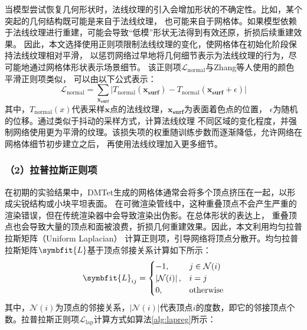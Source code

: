 当模型尝试恢复几何形状时，法线纹理的引入会增加形状的不确定性。比如，某个突起的几何结构既可能是来自于法线纹理，
也可能来自于网格体。如果模型依赖于法线纹理进行重建，可能会导致“低模”形状无法得到有效还原，折损后续重建效果。
因此，本文选择使用正则项限制法线纹理的变化，使网格体在初始化阶段保持法线纹理相对平滑，
以惩罚网络过早地将几何细节表示为法线纹理的行为，尽可能地通过网格体形状表示场景细节。
该正则项$\mathcal{L}_{\text{normal}}$与Zhang等人\cite{zhang2021nerfactor}使用的颜色平滑正则项类似，
可以由以下公式表示：
\begin{equation}
  \label{eq:nrm_smooth}
  \mathcal{L}_{\text{normal}} = \sum_{\boldsymbol{x_\text{surf}}} {\lvert {T_{\text{normal}}({\boldsymbol{x_\text{surf}}})} - {T_{\text{normal}}({\boldsymbol{x_\text{surf}}}+\epsilon)}\rvert}
\end{equation}
其中，$T_{\text{normal}}(x)$代表采样$\boldsymbol{x}$点的法线纹理，$\boldsymbol{x_\text{surf}}$为表面着色点的位置，
$\epsilon$为随机的位移。通过类似于抖动的采样方式，计算法线纹理
不同区域的变化程度，并强制网络使用更为平滑的纹理。该损失项的权重随训练步数而逐渐降低，允许网络在网格体细节初步建立之后，
再使用法线纹理加入更多细节。

\subsubsection*{（2）拉普拉斯正则项}

在初期的实验结果中，DMTet生成的网格体通常会将多个顶点挤压在一起，以形成尖锐结构或小块平坦表面。
在可微渲染管线中，这种重叠顶点不会产生严重的渲染错误，但在传统渲染器中会导致渲染出伪影。在总体形状的表达上，
重叠顶点也会导致大量的顶点和面被浪费，折损几何重建效果。因此，本文利用均匀拉普拉斯矩阵（Uniform Laplacian）
计算正则项，引导网络将顶点分散开。均匀拉普拉斯矩阵$\symbfit{L}$基于顶点邻接关系计算如下所示：
\begin{equation}
  \symbfit{L}_{ij} =
  \begin{cases}
  -1, & j \in \mathcal{N}(i) \\
  \left|\mathcal{N}(i)\right|, & i = j \\
  0, & \text{otherwise}
  \end{cases}
  \label{eq:uniform_lap}
\end{equation}
其中，$\mathcal{N}(i)$为顶点的邻接关系，$\left|\mathcal{N}(i)\right|$代表顶点$i$的度数，即它的邻接顶点个数。拉普拉斯正则项$\mathcal{L}_\text{lap}$计算方式如算法\ref{alg:lapreg}所示：
\renewcommand{\algorithmicrequire}{\textbf{输入：}\unskip}
\renewcommand{\algorithmicensure}{\textbf{输出：}\unskip}

